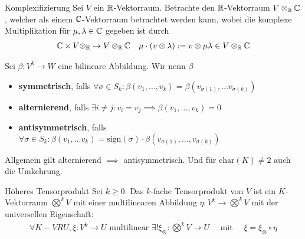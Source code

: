 \begin{satz}{Komplexifizierung}
    Sei $V$ ein $\mathbb{R}$-Vektorraum. Betrachte den $\mathbb{R}$-Vektorraum $V \otimes_{\mathbb{R}} \mathbb{C}$, welcher als einem $\mathbb{C}$-Vektorraum betrachtet werden kann, wobei die komplexe Multiplikation für $\mu, \lambda \in \mathbb{C}$ gegeben ist durch
    \begin{align*}
        \mathbb{C} \times V \otimes_{\mathbb{R}} \to V \otimes_{\mathbb{R}} \mathbb{C} \quad \mu \cdot (v \otimes \lambda) := v \otimes \mu \lambda \in V \otimes_{\mathbb{R}} \mathbb{C}
    \end{align*}
\end{satz}

Sei $\beta: V^k \to W$ eine bilineare Abbildung. Wir nenn $\beta$
\begin{itemize}
    \item   \textbf{symmetrisch}, falls $\forall \sigma \in S_k: \beta(v_1, \ldots, v_k) = \beta(v_{\sigma(1)}, \ldots v_{\sigma(k)})$
    \item   \textbf{alternierend}, falls $\exists i\neq j: v_i = v_j \implies \beta(v_1, \ldots, v_k) = 0$
    \item   \textbf{antisymmetrisch}, falls $\forall \sigma \in S_k: \beta(v_1, \ldots v_k) = \text{sign}(\sigma) \cdot \beta(v_{\sigma(1)}, \ldots, v_{\sigma(k)})$
\end{itemize}
Allgemein gilt alternierend $\implies$ antisymmetrisch. Und für $\text{char}(K) \neq 2$ auch die Umkehrung.

\begin{definition}{Höheres Tensorprodukt}
    Sei $k \geq 0$. Das $k$-fache Tensorprodukt von $V$ ist ein $K$-Vektorraum $\bigotimes^k V$ mit einer multilinearen Abbildung $\eta: V^k \to \bigotimes^k V$ mit der universellen Eigenschaft:
    \begin{align*}
        \forall K-VR U, \xi: V^k \to U \text{ multilinear } \exists! \xi_{\otimes}: \bigotimes^k V \to U \quad \text{ mit } \quad \xi = \xi_{\otimes} \circ \eta
    \end{align*}
\end{definition}

